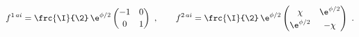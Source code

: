 \begin{equation}
  f^{1\,ai} = \frc{\I}{\2}\, \e^{\phi/2} \begin{pmatrix} -1 & 0 \\[2pt]
  0 & 1 \end{pmatrix}\ ,\qquad f^{2\,ai} = \frc{\I}{\2}\, \e^{\phi/2}
  \begin{pmatrix} \chi & \e^{\phi/2} \\[2pt] \e^{\phi/2} & -\chi
  \end{pmatrix}\ .
 \end{equation}

